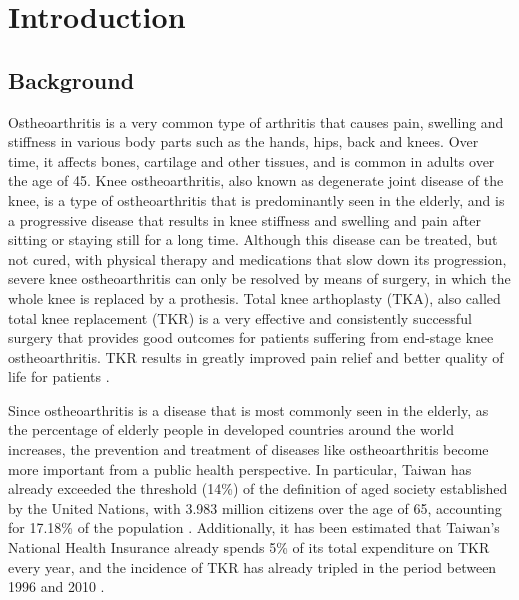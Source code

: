 \documentclass[../main.tex]{subfiles}
\begin{document}
	
\chapter{Introduction}
\section{Background}
 
 Ostheoarthritis is a very common type of arthritis that causes pain, swelling and stiffness in various body parts such as the hands, hips, back and knees. Over time, it affects bones, cartilage and other tissues, and is common in adults over the age of 45. Knee ostheoarthritis, also known as degenerate joint disease of the knee, is a type of ostheoarthritis that is predominantly seen in the elderly, and is a progressive disease that results in knee stiffness and swelling and pain after sitting or staying still for a long time. Although this disease can be treated, but not cured, with physical therapy and medications that slow down its progression, severe knee ostheoarthritis can only be resolved by means of surgery, in which the whole knee is replaced by a prothesis. Total knee arthoplasty (TKA), also called total knee replacement (TKR) is a very effective and consistently successful surgery that provides good outcomes for patients suffering from end-stage knee ostheoarthritis. TKR results in greatly improved pain relief and better quality of life for patients \cite{varacalloTotalKneeArthroplasty2025}.
 
Since ostheoarthritis is a disease that is most commonly seen in the elderly, as the percentage of elderly people in developed countries around the world increases, the prevention and treatment of diseases like ostheoarthritis become more important from a public health perspective. In particular, Taiwan has already  exceeded the threshold (14\%) of the definition of aged society established by the United Nations, with 3.983 million citizens over the age of 65, accounting for 17.18\% of the population \cite{ElderlyDisadvantagedSituation2024}. Additionally, it has been estimated that Taiwan's National Health Insurance already spends 5\% of its total expenditure on TKR every year, and the incidence of TKR has already tripled in the period between 1996 and 2010 \cite{linIncreaseTotalKnee2018}.
 
\end{document}

